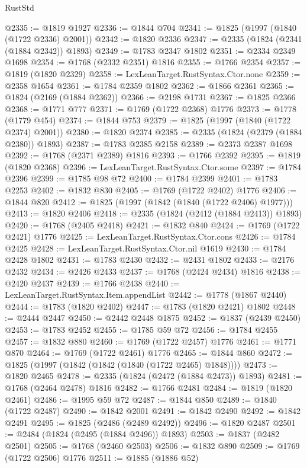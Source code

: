 \begin{lexlean}{RustStd}
\begin{coremodule}
@2335 := @1819 @1927
@2336 := @1844 @704
@2341 := @1825 (@1997 (@1840 (@1722 @2336) @2001))
@2342 := @1820 @2336
@2347 := @2335 (@1824 (@2341 (@1884 @2342)) @1893)
@2349 := @1783 @2347 @1802
@2351 := @2334 @2349 @1698
@2354 := @1768 (@2332 @2351) @1816
@2355 := @1766 @2354
@2357 := @1819 (@1820 @2329)
@2358 := LexLeanTarget.RustSyntax.Ctor.none
@2359 := @2358 @1654
@2361 := @1784 @2359 @1802
@2362 := @1866 @2361
@2365 := @1824 (@2169 (@1884 @2362))
@2366 := @2198 @1731
@2367 := @1825 @2366
@2368 := @1771 @777
@2371 := @1769 (@1722 @2368) @1776
@2373 := @1778 (@1779 @454)
@2374 := @1844 @753
@2379 := @1825 (@1997 (@1840 (@1722 @2374) @2001))
@2380 := @1820 @2374
@2385 := @2335 (@1824 (@2379 (@1884 @2380)) @1893)
@2387 := @1783 @2385 @2158
@2389 := @2373 @2387 @1698
@2392 := @1768 (@2371 @2389) @1816
@2393 := @1766 @2392
@2395 := @1819 (@1820 @2368)
@2396 := LexLeanTarget.RustSyntax.Ctor.some
@2397 := @1784 @2396
@2399 := @1785 @98 @72
@2400 := @1784 @2399
@2401 := @1783 @2253
@2402 := @1832 @830
@2405 := @1769 (@1722 @2402) @1776
@2406 := @1844 @820
@2412 := @1825 (@1997 (@1842 (@1840 (@1722 @2406) @1977)))
@2413 := @1820 @2406
@2418 := @2335 (@1824 (@2412 (@1884 @2413)) @1893)
@2420 := @1768 (@2405 @2418)
@2421 := @1832 @840
@2424 := @1769 (@1722 @2421) @1776
@2425 := LexLeanTarget.RustSyntax.Ctor.cons
@2426 := @1784 @2425
@2428 := LexLeanTarget.RustSyntax.Ctor.nil @1619
@2430 := @1784 @2428 @1802
@2431 := @1783 @2430
@2432 := @2431 @1802
@2433 := @2176 @2432
@2434 := @2426 @2433
@2437 := @1768 (@2424 @2434) @1816
@2438 := @2420 @2437
@2439 := @1766 @2438
@2440 := LexLeanTarget.RustSyntax.Item.appendList
@2442 := @1778 (@1867 @2440)
@2444 := @1783 (@1820 @2402)
@2447 := @1783 (@1820 @2421) @1802
@2448 := @2444 @2447
@2450 := @2442 @2448 @1875
@2452 := @1837 (@2439 @2450)
@2453 := @1783 @2452
@2455 := @1785 @59 @72
@2456 := @1784 @2455
@2457 := @1832 @880
@2460 := @1769 (@1722 @2457) @1776
@2461 := @1771 @870
@2464 := @1769 (@1722 @2461) @1776
@2465 := @1844 @860
@2472 := @1825 (@1997 (@1842 (@1842 (@1840 (@1722 @2465) @1848))))
@2473 := @1820 @2465
@2478 := @2335 (@1824 (@2472 (@1884 @2473)) @1893)
@2481 := @1768 (@2464 @2478) @1816
@2482 := @1766 @2481
@2484 := @1819 (@1820 @2461)
@2486 := @1995 @59 @72
@2487 := @1844 @850
@2489 := @1840 (@1722 @2487)
@2490 := @1842 @2001
@2491 := @1842 @2490
@2492 := @1842 @2491
@2495 := @1825 (@2486 (@2489 @2492))
@2496 := @1820 @2487
@2501 := @2484 (@1824 (@2495 (@1884 @2496)) @1893)
@2503 := @1837 (@2482 @2501)
@2505 := @1768 (@2460 @2503)
@2506 := @1832 @890
@2509 := @1769 (@1722 @2506) @1776
@2511 := @1885 (@1886 @52)

\end{coremodule}
\end{lexlean}
